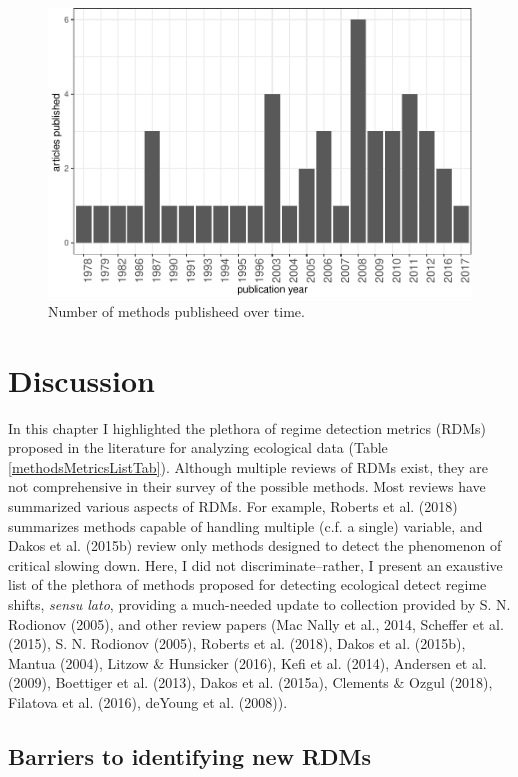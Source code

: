 \documentclass[12pt,twoside,openany]{reedthesis}
\begin{document}
\begin{figure}
\centering
\includegraphics{_myDissertation_files/figure-latex/jrnlYearFig-1.pdf}
\caption{\label{fig:jrnlYearFig}Number of methods publisheed over time.}
\end{figure}
\section{Discussion}\label{discussion}

In this chapter I highlighted the plethora of regime detection metrics
(RDMs) proposed in the literature for analyzing ecological data (Table
\ref{methodsMetricsListTab}). Although multiple reviews of RDMs exist,
they are not comprehensive in their survey of the possible methods. Most
reviews have summarized various aspects of RDMs. For example, Roberts et
al. (2018) summarizes methods capable of handling multiple (c.f. a
single) variable, and Dakos et al. (2015b) review only methods designed
to detect the phenomenon of critical slowing down. Here, I did not
discriminate--rather, I present an exaustive list of the plethora of
methods proposed for detecting ecological detect regime shifts,
\emph{sensu lato}, providing a much-needed update to collection provided
by S. N. Rodionov (2005), and other review papers (Mac Nally et al.,
2014, Scheffer et al. (2015), S. N. Rodionov (2005), Roberts et al.
(2018), Dakos et al. (2015b), Mantua (2004), Litzow \& Hunsicker (2016),
Kefi et al. (2014), Andersen et al. (2009), Boettiger et al. (2013),
Dakos et al. (2015a), Clements \& Ozgul (2018), Filatova et al. (2016),
deYoung et al. (2008)).

\subsection{Barriers to identifying new
RDMs}\label{barriers-to-identifying-new-rdms}
\end{document}
